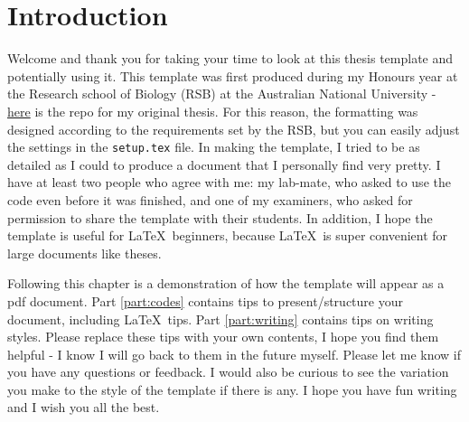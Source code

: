 \chapter{Introduction}
\label{intro}

Welcome and thank you for taking your time to look at this thesis template and potentially using it. This template was first produced during my Honours year at the Research school of Biology (RSB) at the Australian National University - \href{https://github.com/Phuong-Le/honours_thesis}{here} is the repo for my original thesis. For this reason, the formatting was designed according to the requirements set by the RSB, but you can easily adjust the settings in the \texttt{setup.tex} file. In making the template, I tried to be as detailed as I could to produce a document that I personally find very pretty. I have at least two people who agree with me: my lab-mate, who asked to use the code even before it was finished, and one of my examiners, who asked for permission to share the template with their students. In addition, I hope the template is useful for \LaTeX\ beginners, because \LaTeX\ is super convenient for large documents like theses.

Following this chapter is a demonstration of how the template will appear as a pdf document. Part \ref{part:codes} contains tips to present/structure your document, including \LaTeX\ tips. Part \ref{part:writing} contains tips on writing styles. Please replace these tips with your own contents, I hope you find them helpful - I know I will go back to them in the future myself. Please let me know if you have any questions or feedback. I would also be curious to see the variation you make to the style of the template if there is any. I hope you have fun writing and I wish you all the best. 